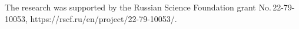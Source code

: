 \Ack



\noindent
The research was supported by the Russian Science Foundation grant No.\,22-79-10053, {\sf https://rscf.ru/en/\linebreak project/22-79-10053/}.

  


